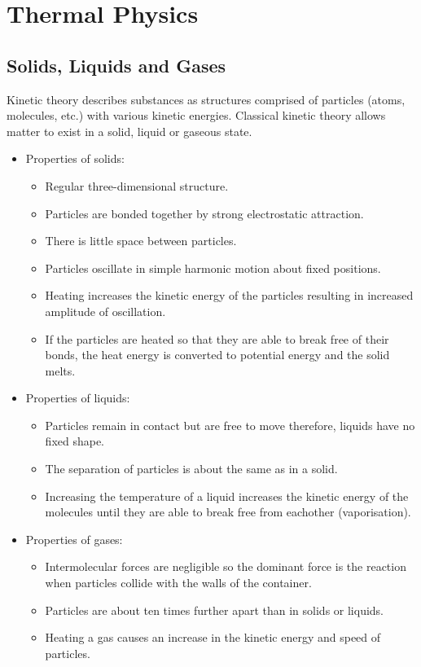 \documentclass[a4,8pt]{article}
\begin{document}
\section{Thermal Physics}
\subsection{Solids, Liquids and Gases}
Kinetic theory describes substances as structures comprised of particles (atoms, molecules, etc.) with various kinetic energies. Classical kinetic theory allows matter to exist in a solid, liquid or gaseous state.

\begin{itemize}
	\item Properties of solids:
		\begin{itemize}
			\item Regular three-dimensional structure.
			\item Particles are bonded together by strong electrostatic attraction.
			\item There is little space between particles.
			\item Particles oscillate in simple harmonic motion about fixed positions.
			\item Heating increases the kinetic energy of the particles resulting in increased amplitude of oscillation.
			\item If the particles are heated so that they are able to break free of their bonds, the heat energy is converted to potential energy and the solid melts.
		\end{itemize}
	\item Properties of liquids:
		\begin{itemize}
			\item Particles remain in contact but are free to move therefore, liquids have no fixed shape.
			\item The separation of particles is about the same as in a solid.
			\item Increasing the temperature of a liquid increases the kinetic energy of the molecules until they are able to break free from eachother (vaporisation).
		\end{itemize}
	\item Properties of gases:
		\begin{itemize}
			\item Intermolecular forces are negligible so the dominant force is the reaction when particles collide with the walls of the container.
			\item Particles are about ten times further apart than in solids or liquids.
			\item Heating a gas causes an increase in the kinetic energy and speed of particles.
		\end{itemize}
\end{itemize}
\end{document}
